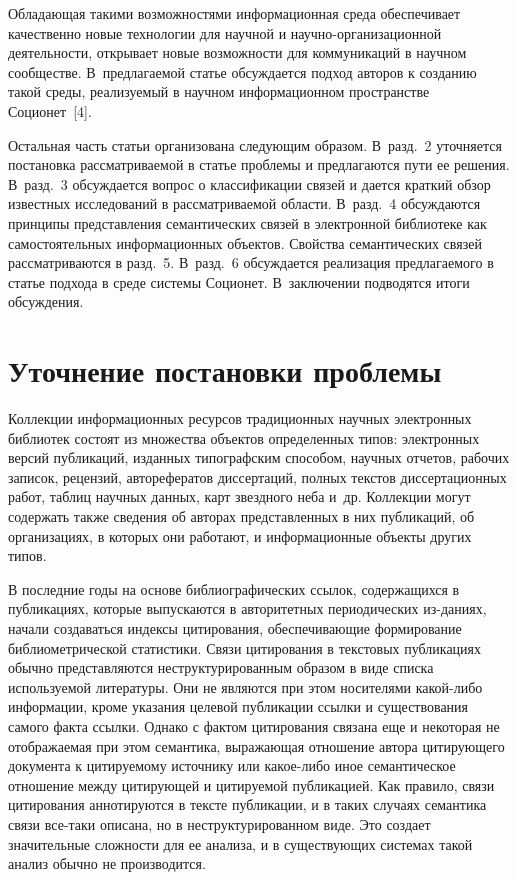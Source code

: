 \begin{multicols}{2}
  Обладающая такими возможностями информационная среда обеспечивает 
качественно новые технологии для научной и 
  на\-уч\-но-ор\-га\-ни\-за\-ци\-он\-ной деятельности, открывает новые 
возможности для коммуникаций в научном сообществе. В~предлагаемой статье 
обсуждается подход авторов к созданию такой среды, реализуемый в научном 
информационном пространстве Соционет~[4].
  
  Остальная часть статьи организована сле\-ду\-ющим образом. В~разд.~2 
уточняется постановка рассматриваемой в статье проблемы и предлагаются 
пути ее решения. В~разд.~3 обсуждается вопрос о классификации связей и 
дается краткий обзор известных исследований в рассматриваемой области. 
В~разд.~4 обсуждаются принципы представления семантических связей в 
электронной библиотеке как самостоятельных информационных объектов. 
Свойства семантических связей рассматриваются в разд.~5. В~разд.~6 
обсуждается реализация предлагаемого в статье подхода в среде системы 
Соционет. В~заключении подводятся итоги обсуждения. 

\section{Уточнение постановки проблемы}

     Коллекции информационных ресурсов традиционных научных 
электронных библиотек состоят из множества объектов определенных типов: 
электронных версий публикаций, изданных типографским способом, научных 
отчетов, рабочих записок, рецензий, авторефератов диссертаций, полных 
текстов диссертационных работ, таблиц научных данных, карт звездного неба 
и~др. Коллекции могут содержать также сведения об авторах представленных в 
них публикаций, об организациях, в которых они работают, и информационные 
объекты других типов.
     
     В последние годы на основе библиографических ссылок, содержащихся в 
публикациях, которые выпускаются в авторитетных периодических из-\linebreak даниях, 
начали создаваться индексы цитирования, обеспечивающие формирование 
биб\-лио\-мет\-ри\-че\-ской статистики. Связи цитирования в текстовых публикациях 
обычно представляются неструктурированным образом в виде списка 
используемой литературы. Они не являются при этом носителями 
     ка\-кой-ли\-бо информации, кроме указания целевой публикации ссылки 
и существования самого факта ссылки. Однако с фактом цитирования связана 
еще и некоторая не отображаемая при этом семантика, выражающая отношение 
автора цитирующего документа к цитируемому источнику или ка\-кое-ли\-бо 
иное семантическое отношение между ци\-ти\-ру\-ющей и цитируемой 
публикацией. Как правило, связи цитирования аннотируются в тексте 
публикации, и в таких случаях семантика связи все-та\-ки описана, но в 
неструктурированном виде. Это создает значительные сложности для ее 
анализа, и в существующих системах такой анализ обычно не производится.
     

\end{multicols}
